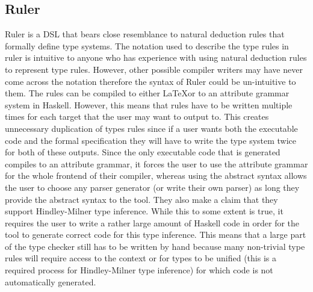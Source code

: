 \subsection{Ruler}
Ruler is a DSL that bears close resemblance to natural deduction rules that formally define type systems\cite{dijkstra2006ruler}.
The notation used to describe the type rules in ruler is intuitive to anyone who has experience with using natural deduction rules to represent type rules.
However, other possible compiler writers may have never come across the notation therefore the syntax of Ruler could be un-intuitive to them.
The rules can be compiled to either \LaTeX or to an attribute grammar system in Haskell.
However, this means that rules have to be written multiple times for each target that the user may want to output to.
This creates unnecessary duplication of types rules since if a user wants both the executable code and the formal specification they will have to write the type system twice for both of these outputs.
Since the only executable code that is generated compiles to an attribute grammar, it forces the user to use the attribute grammar for the whole frontend of their compiler, whereas using the abstract syntax allows the user to choose any parser generator (or write their own parser) as long they provide the abstract syntax to the tool.
They also make a claim that they support Hindley-Milner type inference.
While this to some extent is true, it requires the user to write a rather large amount of Haskell code in order for the tool to generate correct code for this type inference.
This means that a large part of the type checker still has to be written by hand because many non-trivial type rules will require access to the context or for types to be unified (this is a required process for Hindley-Milner type inference) for which code is not automatically generated.

